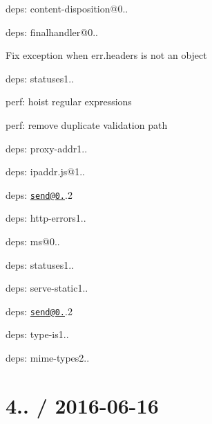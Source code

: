 \begin{DoxyItemize}
\item deps\+: content-\/disposition@0..
\item deps\+: finalhandler@0..
\begin{DoxyItemize}
\item Fix exception when {\ttfamily err.\+headers} is not an object
\item deps\+: statuses1..
\item perf\+: hoist regular expressions
\item perf\+: remove duplicate validation path
\end{DoxyItemize}
\item deps\+: proxy-\/addr1..
\begin{DoxyItemize}
\item deps\+: ipaddr.\+js@1..
\end{DoxyItemize}
\item deps\+: \href{mailto:send@0.14}{\tt send@0.}.2
\begin{DoxyItemize}
\item deps\+: http-\/errors1..
\item deps\+: ms@0..
\item deps\+: statuses1..
\end{DoxyItemize}
\item deps\+: serve-\/static1..
\begin{DoxyItemize}
\item deps\+: \href{mailto:send@0.14}{\tt send@0.}.2
\end{DoxyItemize}
\item deps\+: type-\/is1..
\begin{DoxyItemize}
\item deps\+: mime-\/types2..
\end{DoxyItemize}
\end{DoxyItemize}

\section*{4.. / 2016-\/06-\/16 }


